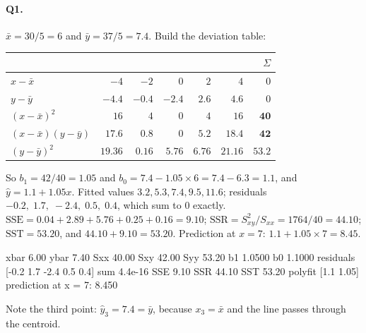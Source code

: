 \documentclass[11pt]{article}
\begin{document}
\paragraph{Q1.} $\bar x = 30/5 = 6$ and $\bar y = 37/5 = 7.4$. Build the
deviation table:
\begin{center}\small
\begin{tabular}{@{}lrrrrr|r@{}}
  \toprule
  & & & & & & $\Sigma$\\
  \midrule
  $x-\bar x$ & $-4$ & $-2$ & $0$ & $2$ & $4$ & $0$\\
  $y-\bar y$ & $-4.4$ & $-0.4$ & $-2.4$ & $2.6$ & $4.6$ & $0$\\
  $(x-\bar x)^2$ & $16$ & $4$ & $0$ & $4$ & $16$ & $\mathbf{40}$\\
  $(x-\bar x)(y-\bar y)$ & $17.6$ & $0.8$ & $0$ & $5.2$ & $18.4$ &
    $\mathbf{42}$\\
  $(y-\bar y)^2$ & $19.36$ & $0.16$ & $5.76$ & $6.76$ & $21.16$ &
    $\mathbf{53.2}$\\
  \bottomrule
\end{tabular}
\end{center}
So $b_1 = 42/40 = 1.05$ and $b_0 = 7.4 - 1.05\times 6 = 7.4 - 6.3 = 1.1$, and
$\hat y = 1.1 + 1.05x$. Fitted values $3.2, 5.3, 7.4, 9.5, 11.6$; residuals
$-0.2,\;1.7,\;-2.4,\;0.5,\;0.4$, which sum to $0$ exactly.
$\mathrm{SSE} = 0.04+2.89+5.76+0.25+0.16 = 9.10$;
$\mathrm{SSR} = S_{xy}^2/S_{xx} = 1764/40 = 44.10$;
$\mathrm{SST} = 53.20$, and $44.10 + 9.10 = 53.20$. Prediction at $x=7$:
$1.1 + 1.05\times 7 = 8.45$.
\begin{codeout}
   xbar 6.00 ybar 7.40 Sxx 40.00 Sxy 42.00 Syy 53.20
   b1 1.0500  b0 1.1000  residuals [-0.2  1.7 -2.4  0.5  0.4]  sum 4.4e-16
   SSE 9.10  SSR 44.10  SST 53.20  polyfit [1.1  1.05]
   prediction at x = 7: 8.450
\end{codeout}
Note the third point: $\hat y_3 = 7.4 = \bar y$, because $x_3 = \bar x$ and
the line passes through the centroid.
\end{document}
